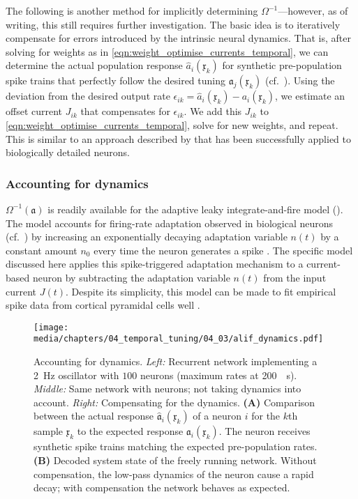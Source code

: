 The following is another method for implicitly determining $\Omega^{-1}$---however, as of writing, this still requires further investigation.
The basic idea is to iteratively compensate for errors introduced by the intrinsic neural dynamics.
That is, after solving for weights as in \cref{eqn:weight_optimise_currents_temporal}, we can determine the actual population response $\hat a_i(\mathfrak{x}_k)$ for synthetic pre-population spike trains that perfectly follow the desired tuning $\mathfrak{a}_j(\mathfrak{x}_k)$ (cf.~).
Using the deviation from the desired output rate $\epsilon_{ik} = \hat a_i(\mathfrak{x}_k) - a_i(\mathfrak{x}_k)$, we estimate an offset current $J_{ik}$ that compensates for $\epsilon_{ik}$.
We add this $J_{ik}$ to \cref{eqn:weight_optimise_currents_temporal}, solve for new weights, and repeat.
This is similar to an approach described by \citet{duggins2017incorporating} that has been successfully applied to biologically detailed neurons.

\subsubsection{Accounting for \ALIF dynamics}
$\Omega^{-1}(\mathfrak{a})$ is readily available for the adaptive leaky integrate-and-fire model (\ALIF).
The \ALIF model accounts for firing-rate adaptation observed in biological neurons (cf.~) by increasing an exponentially decaying adaptation variable $n(t)$ by a constant amount $n_0$ every time the neuron generates a spike \citep{treves1993meanfield}.
The specific \ALIF model discussed here applies this spike-triggered adaptation mechanism to a current-based \LIF neuron by subtracting the adaptation variable $n(t)$ from the input current $J(t)$.
Despite its simplicity, this model can be made to fit empirical spike data from cortical pyramidal cells well \citep{camera2004minimal}.

\begin{figure}
	\texttt{[image: media/chapters/04\_temporal\_tuning/04\_03/alif\_dynamics.pdf]}%
	{\label{fig:alif_a}}%
	{\label{fig:alif_b}}%
	\caption[Accounting for ALIF dynamics]{
		Accounting for \ALIF dynamics.
		\emph{Left:} Recurrent network implementing a \SI{2}{\hertz} oscillator with $100$ \LIF neurons (maximum rates at \SI{200}{\per\second}).
		\emph{Middle:} Same network with \ALIF neurons; not taking dynamics into account.
		\emph{Right:} Compensating for the \ALIF dynamics.
		\textbf{(A)} Comparison between the actual response $\hat{\mathfrak{a}}_i(\mathfrak{x}_k)$ of a neuron $i$ for the $k$th sample $\mathfrak{x}_k$ to the expected response $\mathfrak{a}_i(\mathfrak{x}_k)$.
		The neuron receives synthetic spike trains matching the expected pre-population rates.
		\textbf{(B)} Decoded system state of the freely running network. Without compensation, the low-pass dynamics of the \ALIF neuron cause a rapid decay; with compensation the network behaves as expected.
	}
	\label{fig:alif}
\end{figure}


